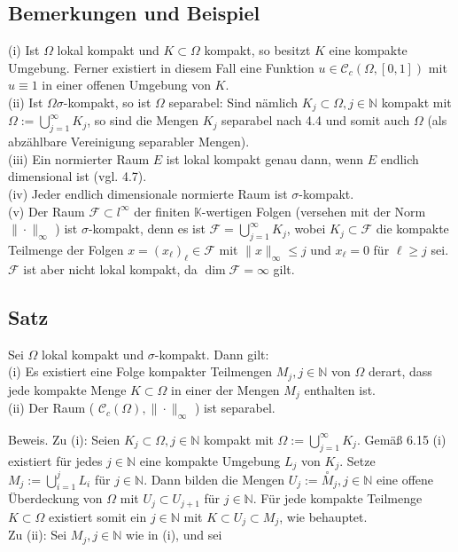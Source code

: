\documentclass[10pt, letterpaper]{article}
\begin{document}
\subsection*{Bemerkungen und Beispiel}
(i) Ist $\Omega$ lokal kompakt und $K \subset \Omega$ kompakt, so besitzt $K$ eine kompakte Umgebung. Ferner existiert in diesem Fall eine Funktion $u \in \mathcal{C}_{c}(\Omega,[0,1])$ mit $u \equiv 1$ in einer offenen Umgebung von $K$.\\
(ii) Ist $\Omega \sigma$-kompakt, so ist $\Omega$ separabel: Sind nämlich $K_{j} \subset \Omega, j \in \mathbb{N}$ kompakt mit $\Omega:=\bigcup_{j=1}^{\infty} K_{j}$, so sind die Mengen $K_{j}$ separabel nach 4.4 und somit auch $\Omega$ (als abzählbare Vereinigung separabler Mengen).\\
(iii) Ein normierter Raum $E$ ist lokal kompakt genau dann, wenn $E$ endlich dimensional ist (vgl. 4.7).\\
(iv) Jeder endlich dimensionale normierte Raum ist $\sigma$-kompakt.\\
(v) Der Raum $\mathcal{F} \subset l^{\infty}$ der finiten $\mathbb{K}$-wertigen Folgen (versehen mit der Norm $\|\cdot\|_{\infty}$ ) ist $\sigma$-kompakt, denn es ist $\mathcal{F}=\bigcup_{j=1}^{\infty} K_{j}$, wobei $K_{j} \subset \mathcal{F}$ die kompakte Teilmenge der Folgen $x=\left(x_{\ell}\right)_{\ell} \in \mathcal{F}$ mit $\|x\|_{\infty} \leq j$ und $x_{\ell}=0$ für $\ell \geq j$ sei. $\mathcal{F}$ ist aber nicht lokal kompakt, da $\operatorname{dim} \mathcal{F}=\infty$ gilt.

\subsection*{Satz}
Sei $\Omega$ lokal kompakt und $\sigma$-kompakt. Dann gilt:\\
(i) Es existiert eine Folge kompakter Teilmengen $M_{j}, j \in \mathbb{N}$ von $\Omega$ derart, dass jede kompakte Menge $K \subset \Omega$ in einer der Mengen $M_{j}$ enthalten ist.\\
(ii) Der Raum ( $\mathcal{C}_{c}(\Omega),\|\cdot\|_{\infty}$ ) ist separabel.

Beweis. Zu (i): Seien $K_{j} \subset \Omega, j \in \mathbb{N}$ kompakt mit $\Omega:=\bigcup_{j=1}^{\infty} K_{j}$. Gemäß 6.15 (i) existiert für jedes $j \in \mathbb{N}$ eine kompakte Umgebung $L_{j}$ von $K_{j}$. Setze $M_{j}:=\bigcup_{i=1}^{j} L_{i}$ für $j \in \mathbb{N}$. Dann bilden die Mengen $U_{j}:=\stackrel{\circ}{M}_{j}, j \in \mathbb{N}$ eine offene Überdeckung von $\Omega$ mit $U_{j} \subset U_{j+1}$ für $j \in \mathbb{N}$. Für jede kompakte Teilmenge $K \subset \Omega$ existiert somit ein $j \in \mathbb{N}$ mit $K \subset U_{j} \subset M_{j}$, wie behauptet.\\
Zu (ii): Sei $M_{j}, j \in \mathbb{N}$ wie in (i), und sei
\end{document}
